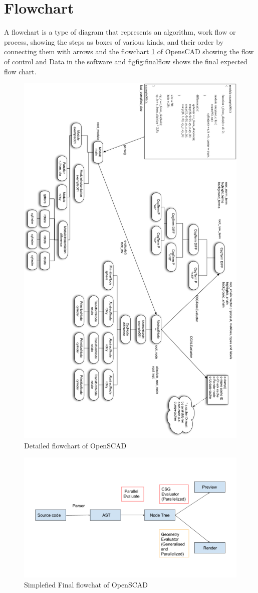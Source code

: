 \section{Flowchart}
A flowchart is a type of diagram that represents an algorithm, work flow or process, showing the steps as boxes of various kinds, and their order by connecting them with arrows
and the flowchart \ref{fig:openscad-compile} of OpensCAD showing the flow of control and Data in the software and fig{fig:finalflow} shows the final expected flow chart.

\begin{figure}
\centering
\includegraphics[height=1.37\columnwidth]{images/OpenSCAD-compile.png}
\caption{Detailed flowchart of OpenSCAD}
\label{fig:openscad-compile}
\end{figure}

\begin{figure}
\centering
\includegraphics[width=1\linewidth]{images/finalflow}
\caption{Simplefied Final flowchat of OpenSCAD}
\label{fig:finalflow}
\end{figure}

